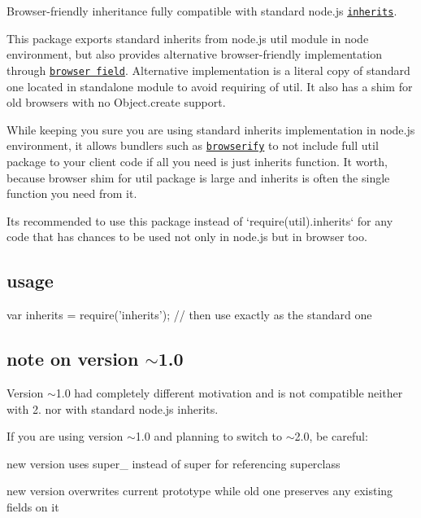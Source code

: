 Browser-\/friendly inheritance fully compatible with standard node.\+js \href{http://nodejs.org/api/util.html#util_util_inherits_constructor_superconstructor}{\tt inherits}.

This package exports standard {\ttfamily inherits} from node.\+js {\ttfamily util} module in node environment, but also provides alternative browser-\/friendly implementation through \href{https://gist.github.com/shtylman/4339901}{\tt browser field}. Alternative implementation is a literal copy of standard one located in standalone module to avoid requiring of {\ttfamily util}. It also has a shim for old browsers with no {\ttfamily Object.\+create} support.

While keeping you sure you are using standard {\ttfamily inherits} implementation in node.\+js environment, it allows bundlers such as \href{https://github.com/substack/node-browserify}{\tt browserify} to not include full {\ttfamily util} package to your client code if all you need is just {\ttfamily inherits} function. It worth, because browser shim for {\ttfamily util} package is large and {\ttfamily inherits} is often the single function you need from it.

It\textquotesingle{}s recommended to use this package instead of `require(\textquotesingle{}util\textquotesingle{}).inherits` for any code that has chances to be used not only in node.\+js but in browser too.

\subsection*{usage}


\begin{DoxyCode}
var inherits = require('inherits');
// then use exactly as the standard one
\end{DoxyCode}


\subsection*{note on version $\sim$1.0}

Version $\sim$1.0 had completely different motivation and is not compatible neither with 2. nor with standard node.\+js {\ttfamily inherits}.

If you are using version $\sim$1.0 and planning to switch to $\sim$2.0, be careful\+:


\begin{DoxyItemize}
\item new version uses {\ttfamily super\+\_\+} instead of {\ttfamily super} for referencing superclass
\item new version overwrites current prototype while old one preserves any existing fields on it 
\end{DoxyItemize}